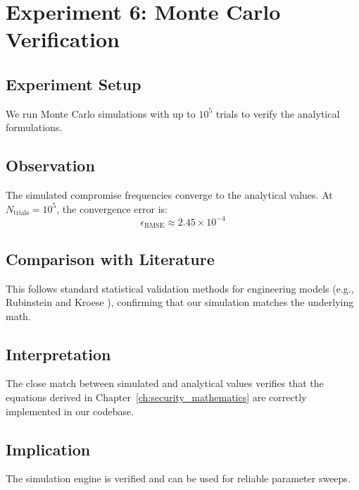 \documentclass[12pt, oneside, a4paper]{report}
\theoremstyle{definition}
\theoremstyle{remark}
\begin{document}
\section{Experiment 6: Monte Carlo Verification}
\label{sec:res:e6}

\subsection{Experiment Setup}
We run Monte Carlo simulations with up to $10^5$ trials to verify the analytical formulations.

\subsection{Observation}
The simulated compromise frequencies converge to the analytical values. At $N_{\mathrm{trials}} = 10^5$, the convergence error is:
\begin{equation}
\epsilon_{\mathrm{RMSE}} \approx 2.45 \times 10^{-4}
\end{equation}

\subsection{Comparison with Literature}
This follows standard statistical validation methods for engineering models (e.g., Rubinstein and Kroese \cite{rubinstein2016simulation}), confirming that our simulation matches the underlying math.

\subsection{Interpretation}
The close match between simulated and analytical values verifies that the equations derived in Chapter~\ref{ch:security_mathematics} are correctly implemented in our codebase.

\subsection{Implication}
The simulation engine is verified and can be used for reliable parameter sweeps.
\end{document}
